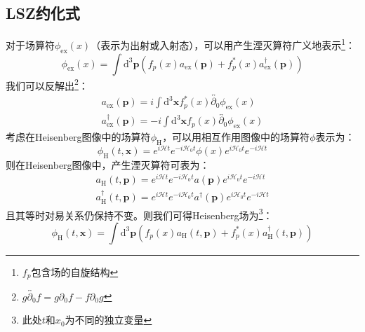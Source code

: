 \subsection{LSZ约化式}
对于场算符$\phi_{\text{ex}}(x)$（表示为出射或入射态），可以用产生湮灭算符广义地表示\footnote{$f_{p}$包含场的自旋结构}：
\begin{equation}
\phi_{\text{ex}}(x)=\int\mathrm{d}^3\boldsymbol{p}\left(f_p(x)a_{\text{ex}}(\boldsymbol{p})+f^*_p(x)a^\dagger_{\text{ex}}(\boldsymbol{p})\right)
\end{equation}
我们可以反解出\footnote{$g\overleftrightarrow{\partial_0}f=g\partial_0f-f\partial_0g$}：
\begin{gather}
a_{\text{ex}}(\boldsymbol{p})=i\int\mathrm{d}^3\boldsymbol{x}f^*_p(x)\overleftrightarrow{\partial_0}\phi_{\text{ex}}(x)\\
a^\dagger_{\text{ex}}(\boldsymbol{p})=-i\int\mathrm{d}^3\boldsymbol{x}f_p(x)\overleftrightarrow{\partial_0}\phi_{\text{ex}}(x)
\end{gather}
考虑在Heisenberg图像中的场算符$\phi_{\text{H}}$，可以用相互作用图像中的场算符$\phi$表示为：
\begin{equation}
\phi_{\text{H}}(t,\boldsymbol{x})=e^{i\mathcal{H}t}e^{-i\mathcal{H}_0t}\phi(x)e^{i\mathcal{H}_0t}e^{-i\mathcal{H}t}
\end{equation}
则在Heisenberg图像中，产生湮灭算符可表为：
\begin{gather}
a_{\text{H}}(t,\boldsymbol{p})=e^{i\mathcal{H}t}e^{-i\mathcal{H}_0t}a(\boldsymbol{p})e^{i\mathcal{H}_0t}e^{-i\mathcal{H}t}\\
a^\dagger_{\text{H}}(t,\boldsymbol{p})=e^{i\mathcal{H}t}e^{-i\mathcal{H}_0t}a^\dagger(\boldsymbol{p})e^{i\mathcal{H}_0t}e^{-i\mathcal{H}t}
\end{gather}
且其等时对易关系仍保持不变。则我们可得Heisenberg场为\footnote{此处$t$和$x_0$为不同的独立变量}：
\begin{equation}
\phi_{\text{H}}(t,\boldsymbol{x})=\int\mathrm{d}^3\boldsymbol{p}\left(f_p(x)a_{\text{H}}(t,\boldsymbol{p})+f^*_p(x)a^\dagger_{\text{H}}(t,\boldsymbol{p})\right)
\end{equation}

